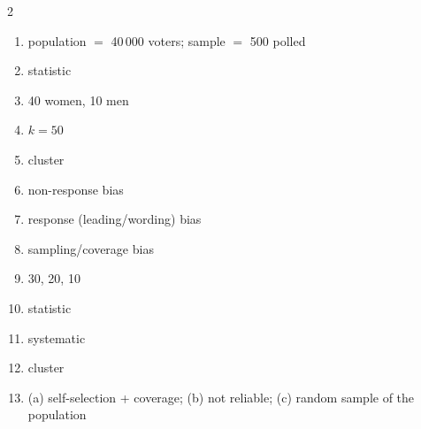 \documentclass[11pt]{article}
\begin{document}
\begin{keybox}
\begin{multicols}{2}
\small
\begin{enumerate}[leftmargin=*,itemsep=3pt]
  \item population $=$ 40\,000 voters; sample $=$ 500 polled
  \item statistic
  \item 40 women, 10 men
  \item $k=50$
  \item cluster
  \item non-response bias
  \item response (leading/wording) bias
  \item sampling/coverage bias
  \item 30, 20, 10
  \item statistic
  \item systematic
  \item cluster
  \item (a) self-selection + coverage; (b) not reliable; (c) random sample of the population
\end{enumerate}
\end{multicols}
\end{keybox}
\end{document}

